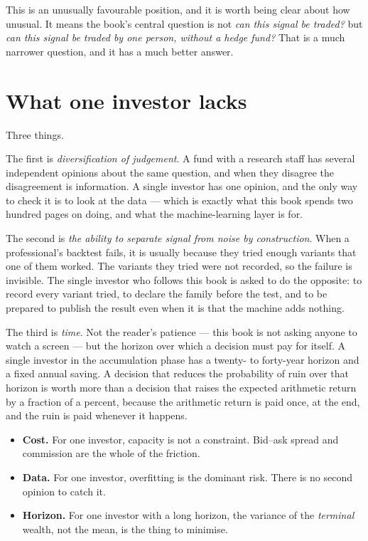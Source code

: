 This is an unusually favourable position, and it is worth being clear about
how unusual. It means the book's central question is not \emph{can this
signal be traded?} but \emph{can this signal be traded by one person, without
a hedge fund?} That is a much narrower question, and it has a much better
answer.

\section{What one investor lacks}

Three things.

The first is \emph{diversification of judgement}. A fund with a research
staff has several independent opinions about the same question, and when they
disagree the disagreement is information. A single investor has one opinion,
and the only way to check it is to look at the data --- which is exactly what
this book spends two hundred pages on doing, and what the machine-learning
layer is for.

The second is \emph{the ability to separate signal from noise by
construction}. When a professional's backtest fails, it is usually because
they tried enough variants that one of them worked. The variants they tried
were not recorded, so the failure is invisible. The single investor who
follows this book is asked to do the opposite: to record every variant tried,
to declare the family before the test, and to be prepared to publish the
result even when it is that the machine adds nothing.

The third is \emph{time}. Not the reader's patience --- this book is not
asking anyone to watch a screen --- but the horizon over which a decision
must pay for itself. A single investor in the accumulation phase has a
twenty- to forty-year horizon and a fixed annual saving. A decision that
reduces the probability of ruin over that horizon is worth more than a
decision that raises the expected arithmetic return by a fraction of a
percent, because the arithmetic return is paid once, at the end, and the
ruin is paid whenever it happens.

\begin{takeaway}
\begin{itemize}
\item \textbf{Cost.} For one investor, capacity is not a constraint.
Bid--ask spread and commission are the whole of the friction.
\item \textbf{Data.} For one investor, overfitting is the dominant risk.
There is no second opinion to catch it.
\item \textbf{Horizon.} For one investor with a long horizon, the variance
of the \emph{terminal} wealth, not the mean, is the thing to minimise.
\end{itemize}
\end{takeaway}

